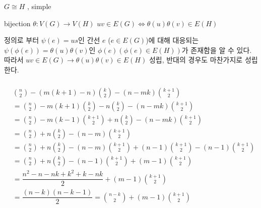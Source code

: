 \subsubsection{}
\subsubsection{}
\subsubsection{} %
$G \cong H$ , simple

bijection $\theta : V(G) \longrightarrow V(H)$
$ uv \in E(G) \Leftrightarrow  \theta(u)\theta(v) \in E(H)$

정의로 부터 $\psi(e) = us$인 간선 $e$ ($e \in E(G)$)에 대해 대응되는 $\psi(\phi(e)) = \theta(u)\theta(v)$인 $\phi(e)(\phi(e) \in E(H))$가 존재함을 알 수 있다. 
따라서 $ uv \in E(G) \rightarrow \theta(u)\theta(v) \in E(H)$ 성립, 반대의 경우도 마찬가지로 성립한다.

\subsubsection{}
\subsubsection{}
\subsubsection{}
\subsubsection{}%

\begin{align}
&{n \choose 2} -  (m(k+1)-n) {k \choose 2} -(n-mk){k+1 \choose 2} \\
&= {n \choose 2} -  m(k+1){k \choose 2}-n{k \choose 2} -(n-mk){k+1 \choose 2} \\
&= {n \choose 2} -  m(k-1){k+1 \choose 2} +n{k \choose 2} -(n-mk){k+1 \choose 2} \\
&= {n \choose 2} + n{k \choose 2} -(n-m){k+1 \choose 2} \\
&= {n \choose 2} + n{k \choose 2} -(n-m){k+1 \choose 2} +(n-1){k+1 \choose 2} - (n-1){k+1 \choose 2}\\
&= {n \choose 2} + n{k \choose 2} - (n-1){k+1 \choose 2} + (m-1){k+1 \choose 2}  \\
&= \dfrac{n^2-n-nk + k^2+k-nk}{2}  + (m-1){k+1 \choose 2} \\
&= \dfrac{(n-k)(n-k-1)}{2}={n-k \choose 2}  + (m-1){k+1 \choose 2}
\end{align}

